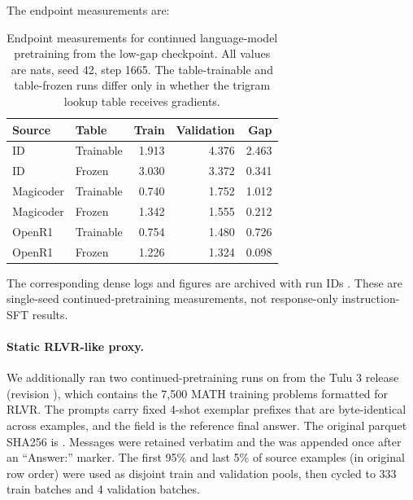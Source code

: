 The endpoint measurements are:

\begin{table}[!htbp]
\centering\small
\caption{Endpoint measurements for continued language-model pretraining from the low-gap checkpoint. All values are nats, seed 42, step 1665. The table-trainable and table-frozen runs differ only in whether the trigram lookup table receives gradients.}
\label{tab:sft-results}
\begin{tabular}{llrrr}
\toprule
Source & Table & Train & Validation & Gap\\
\midrule
ID & Trainable & 1.913 & 4.376 & 2.463\\
ID & Frozen & 3.030 & 3.372 & 0.341\\
Magicoder & Trainable & 0.740 & 1.752 & 1.012\\
Magicoder & Frozen & 1.342 & 1.555 & 0.212\\
OpenR1 & Trainable & 0.754 & 1.480 & 0.726\\
OpenR1 & Frozen & 1.226 & 1.324 & 0.098\\
\bottomrule
\end{tabular}
\end{table}

The corresponding dense logs and figures are archived with run IDs . These are single-seed continued-pretraining measurements, not response-only instruction-SFT results.

\paragraph{Static RLVR-like proxy.}
We additionally ran two continued-pretraining runs on  from the Tulu 3 release~\citep{lambert2024tulu3} (revision ), which contains the 7,500 MATH training problems formatted for RLVR. The prompts carry fixed 4-shot exemplar prefixes that are byte-identical across examples, and the  field is the reference final answer. The original parquet SHA256 is . Messages were retained verbatim and the  was appended once after an ``Answer:'' marker. The first 95\% and last 5\% of source examples (in original row order) were used as disjoint train and validation pools, then cycled to 333 train batches and 4 validation batches.

